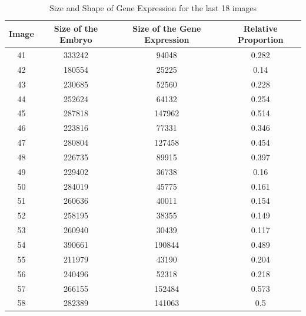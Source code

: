 \documentclass{article}
\begin{document}
\begin{table}[h!]
    \centering
    \begin{tabular}{|c|c|c|c|}
    \hline
    Image & Size of the Embryo & Size of the Gene Expression & Relative Proportion \\  \hline
    41 & 333242 & 94048 & 0.282 \\ \hline
    42 & 180554 & 25225 & 0.14 \\ \hline
    43 & 230685 & 52560 & 0.228 \\ \hline
    44 & 252624 & 64132 & 0.254 \\ \hline
    45 & 287818 & 147962 & 0.514 \\ \hline
    46 & 223816 & 77331 & 0.346 \\ \hline
    47 & 280804 & 127458 & 0.454 \\ \hline
    48 & 226735 & 89915 & 0.397 \\ \hline
    49 & 229402 & 36738 & 0.16 \\ \hline
    50 & 284019 & 45775 & 0.161 \\ \hline
    51 & 260636 & 40011 & 0.154 \\ \hline
    52 & 258195 & 38355 & 0.149 \\ \hline
    53 & 260940 & 30439 & 0.117 \\ \hline
    54 & 390661 & 190844 & 0.489 \\ \hline
    55 & 211979 & 43190 & 0.204 \\ \hline
    56 & 240496 & 52318 & 0.218 \\ \hline
    57 & 266155 & 152484 & 0.573 \\ \hline
    58 & 282389 & 141063 & 0.5 \\ \hline
    \end{tabular}
    \caption{Size and Shape of Gene Expression for the last 18 images}
    \label{tab:size_shape_embryo_pt2}
\end{table}
\end{document}
